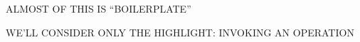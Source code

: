 \begin{bwslide}
\bf

\begin{nrtc}
\item	ALMOST OF THIS IS ``BOILERPLATE''
\item	WE'LL CONSIDER ONLY THE HIGHLIGHT:
		INVOKING AN OPERATION
\end{nrtc}
\end{bwslide}


%


%
%
%
%
%
%
%
%
%
%


%


